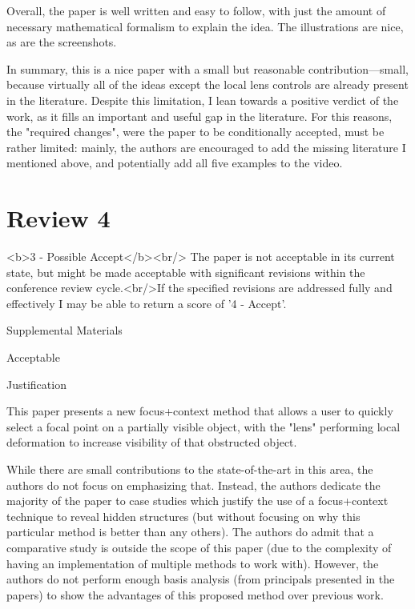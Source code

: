 \documentclass[a4paper,10pt]{article}
\begin{document}
    Overall, the paper is well written and easy to follow, with just the amount of
    necessary mathematical formalism to explain the idea. The illustrations are nice,
    as are the screenshots.

    In summary, this is a nice paper with a small but reasonable contribution---small,
    because virtually all of the ideas except the local lens controls are already
    present in the literature. Despite this limitation, I lean towards a positive
    verdict of the work, as it fills an important and useful gap in the literature.
    For this reasons, the "required changes", were the paper to be conditionally
    accepted, must be rather limited: mainly, the authors are encouraged to add the
    missing literature I mentioned above, and potentially add all five examples to the
    video.
    
    

\section{Review 4}

<b>3 - Possible Accept</b><br/> The paper is not acceptable in its current state,
    but might be made acceptable with significant revisions within the conference
    review cycle.<br/>If the specified revisions are addressed fully and effectively I
    may be able to return a score of '4 - Accept'.

  Supplemental Materials

    Acceptable

  Justification

    This paper presents a new focus+context method that allows a user to quickly
    select a focal point on a partially visible object, with the "lens" performing
    local deformation to increase visibility of that obstructed object.

    While there are small contributions to the state-of-the-art in this area, the
    authors do not focus on emphasizing that. Instead, the authors dedicate the
    majority of the paper to case studies which justify the use of a focus+context
    technique to reveal hidden structures (but without focusing on why this particular
    method is better than any others). The authors do admit that a comparative study
    is outside the scope of this paper (due to the complexity of having an
    implementation of multiple methods to work with). However, the authors do not
    perform enough basis analysis (from principals presented in the papers) to show
    the advantages of this proposed method over previous work.
\end{document}
